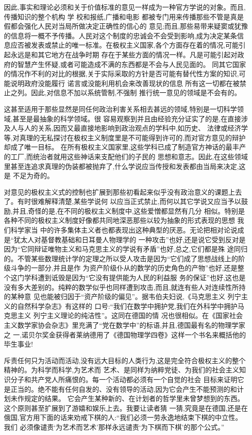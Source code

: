 ﻿\documentclass[12pt]{article}
\begin{document}
因此,事实和理论必须和关于价值标准的意见一样成为一种官方学说的对象。而且,传播知识的整个机构 \myrule 学
校和报纸,广播和电影 \myrule 都被专门用来传播那些不管是真是假都会强化人民对当局所做决定正确性的信心的
意见;而且,那些易带来疑窦或犹豫的信息将一概不予传播。人民对这个制度的忠诚会不会受到影响,成为决定某条信
息应否被发表或禁止的唯一标准。在极权主义国家,各个方面存在着的情况,可能引起永远是和其它地方在战争时期
存在于某些方面的情况一样。凡是可能引起对政府的智慧产生怀疑,或者可能造成不满的东西都是不会与人民见面的。
同其它国家的情况作不利的对比的根据,关于实际采取的方针是否可能有替代性方案的知识,可能说明政府没能履行
诺言或没能利用机会来改善现状的信息 \myrule 所有这一切都在被禁止之列。因此,对信息不加以系统管制,不强制
推行统一意见的领域是不会有的。

这甚至适用于那些显然是同任何政治利害关系相去甚远的领域,特别是一切科学领域,甚至是最抽象的科学领域。很
容易观察到并且由经验充分证实了的是,在直接涉及人与人的关系,因而又最直接地影响到政治观点的学科中,如历史、
法律或经济学等,对真理的无私探讨在极权主义制度里是不可能得到许可的,而对官方意见的辩护却成了唯一目标。
在所有极权主义国家里,这些学科已成了制造官方神话的最丰产的工厂,而统治者就用这些神话来支配他们的子民的
思想和意志。因此,在这些领域里甚至连追求真理的伪装都被抛弃了,什么学说应当传授和发表都由当局来决定,这是
不足为奇的。

对意见的极权主义式的控制也扩展到那些初看起来似乎没有政治意义的课题上去了。有时很难解释清楚,某些学说何
以应当正式禁止,而何以其它学说又应当予以鼓励,并且,奇怪的是,在不同的极权主义制度中,这些爱憎都显然有几分
相似。特别是各种不同的极权主义制度好像都共同地深恶那些以较为抽象的形式表现的思想 \myrule 我们科学家当
中的许多集体主义者也都表现出这种典型的厌恶。无论把相对论说成是``犹太人对基督教基础和日耳曼人物理学的
一种攻击''也好,还是说它受到反对是因为``它同辩证唯物主义和马克思主义的学说有矛盾''也好,总之,它们都是殊
途同归的。不管某些数理统计学的定理之所以受人攻击是因为``它们成了思想战线上的阶级斗争的一部分,并且是作
为资产阶级仆从的数学的历史角色的产物''也好,还是整个这门学科遭到诋毁是因为``它没有提供能为人民的利益服
务的保证''也好,这也是没有多大差别的。纯粹的数学似乎也同样遭到攻击,而且,就连有些人对连续性所持的某种意
见也能被归因于``资产阶级的偏见''。据韦伯夫妇说,《马克思主义 \myrule 列宁主义的自然科学杂志》有这样的
口号:``我们在数学中拥护党,我们在外科学中拥护马克思主义 \myrule 列宁主义理论的纯洁性''。这同在德国的情
况也很相似。在《国家社会主义数学家协会杂志》里充满了``党在数学中''的标语,并且,德国最有名的物理学家之
一,诺贝尔奖金获得者莱纳德用了《德国物理学四卷》这样一个书名来概括他的毕生事业!

斥责任何只为活动而活动,没有远大目标的人类行为,这是完全符合极权主义的整个精神的。为科学而科学,为艺术而
艺术、是同样为纳粹党徒、为我们的社会主义知识分子和共产党人所痛恨的。每一个活动都必须有一个自觉的社会
目标来证明它是正当的。绝不能有任何自发的、没有领导的活动,因为它会产生不能预测的和计划未作规定的结果。
它会产生某种新的、在计划者的哲学里未曾梦想到的东西。这个原则甚至扩展到了游嬉和娱乐上去。我要让读者猜
一猜,究竟是在德国,还是在俄国,官方用下面的话来劝戒下棋的人:``我们必须一劳永逸地结束下棋的中立性。我们
必须像谴责‘为艺术而艺术’那样永远谴责‘为下棋而下棋’的那个公式。''
\end{document}
